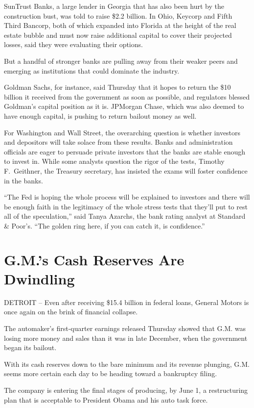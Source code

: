 \documentclass[12pt,a4paper,onecolumn]{article}
\begin{document}
SunTrust Banks, a large lender in Georgia that has also been hurt by the construction bust, was told
to raise \$2.2 billion. In Ohio, Keycorp and Fifth Third Bancorp, both of which expanded into
Florida at the height of the real estate bubble and must now raise additional capital to cover their
projected losses, said they were evaluating their options.

But a handful of stronger banks are pulling away from their weaker peers and emerging as
institutions that could dominate the industry.

Goldman Sachs, for instance, said Thursday that it hopes to return the \$10 billion it received from
the government as soon as possible, and regulators blessed Goldman's capital position as it is.
JPMorgan Chase, which was also deemed to have enough capital, is pushing to return bailout money as
well.

For Washington and Wall Street, the overarching question is whether investors and depositors will
take solace from these results. Banks and administration officials are eager to persuade private
investors that the banks are stable enough to invest in. While some analysts question the rigor of
the tests, Timothy F.~Geithner, the Treasury secretary, has insisted the exams will foster
confidence in the banks.

``The Fed is hoping the whole process will be explained to investors and there will be enough faith
in the legitimacy of the whole stress tests that they'll put to rest all of the speculation,'' said
Tanya Azarchs, the bank rating analyst at Standard \& Poor's. ``The golden ring here, if you can
catch it, is confidence.''

\section{G.M.'s Cash Reserves Are Dwindling}

DETROIT -- Even after receiving \$15.4 billion in federal loans, General Motors is once again on the
brink of financial collapse.

The automaker's first-quarter earnings released Thursday showed that G.M. was losing more money and
sales than it was in late December, when the government began its bailout.

With its cash reserves down to the bare minimum and its revenue plunging, G.M. seems more certain
each day to be heading toward a bankruptcy filing.

The company is entering the final stages of producing, by June 1, a restructuring plan that is
acceptable to President Obama and his auto task force.
\end{document}
